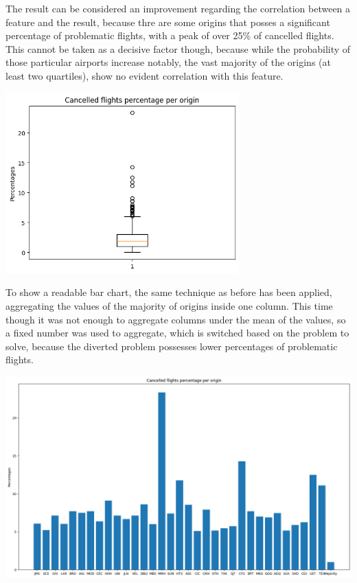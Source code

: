 \documentclass[
	letterpaper, %
	10pt, %
]{class}
\begin{document}
The result can be considered an improvement regarding the correlation between a feature and the result, because thre are some origins that posses a significant percentage
of problematic flights, with a peak of over 25\% of cancelled flights. This cannot be taken as a decisive factor though, because while the probability of those particular airports increase notably, the vast majority of the origins (at least two quartiles), show no evident correlation with this feature.

\begin{center}
    \includegraphics[width=9cm]{../images/cancelled_box_per_origin.png}
\end{center}

To show a readable bar chart, the same technique as before has been applied, aggregating the values of the majority of origins inside one column. This time though it was not enough to aggregate columns under the mean of the values, so a fixed number was used to aggregate, which is switched based on the problem to solve,
because the diverted problem possesses lower percentages of problematic flights.

\begin{center}
    \includegraphics[width=14cm]{../images/cancelled_per_origin.png}
\end{center}
\newpage
\end{document}
